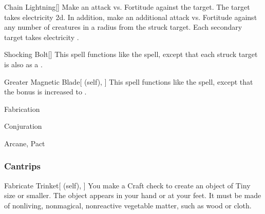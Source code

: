 \lowercase{\hypertarget{spell:Chain Lightning}{}}\label{spell:Chain Lightning}
\begin{freeability}[\nth{4}]{\hypertarget{spell:Chain Lightning}{Chain Lightning}}[]
Make an attack vs. Fortitude against the target.
\hit The target takes electricity  \plus2d.
In addition, make an additional attack vs. Fortitude against any number of creatures in a \areasmall radius from the struck target.
\hit Each secondary target takes electricity .
\end{freeability}
\vspace{0.25em}



\lowercase{\hypertarget{spell:Shocking Bolt}{}}\label{spell:Shocking Bolt}
\begin{freeability}[\nth{4}]{\hypertarget{spell:Shocking Bolt}{Shocking Bolt}}[]
This spell functions like the  spell, except that each struck target is also  as a .
\end{freeability}
\vspace{0.25em}



\lowercase{\hypertarget{spell:Greater Magnetic Blade}{}}\label{spell:Greater Magnetic Blade}
\begin{attuneability}[\nth{6}]{\hypertarget{spell:Greater Magnetic Blade}{Greater Magnetic Blade}}[ (self), ]
This spell functions like the  spell, except that the bonus is increased to .
\end{attuneability}
\vspace{0.25em}


\newpage
\begin{spellsection}{Fabrication}

\begin{spellheader}
\end{spellheader}


 Conjuration

 Arcane, Pact

\subsubsection{Cantrips}


\begin{attuneability}{Fabricate Trinket}[ (self), ]
You make a Craft check to create an object of Tiny size or smaller.
The object appears in your hand or at your feet.
It must be made of nonliving, nonmagical, nonreactive vegetable matter, such as wood or cloth.
\end{attuneability}

\end{spellsection}



